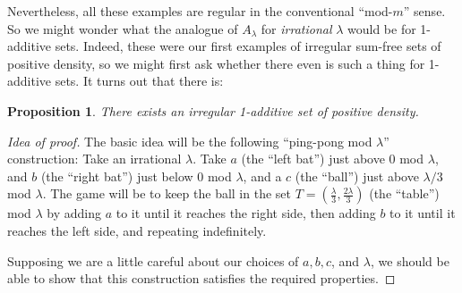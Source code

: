 \documentclass{report}
\newtheorem{proposition}[theorem]{Proposition}
\theoremstyle{remark}
\numberwithin{equation}{section}
\begin{document}
Nevertheless, all these examples are regular in the conventional
``mod-$m$'' sense.  So we might wonder what the analogue of
$A_\lambda$ for {\em irrational} $\lambda$ would be for 1-additive sets.
Indeed, these were our first examples of irregular sum-free sets of
positive density, so we might first ask whether there even is such a
thing for 1-additive sets.  It turns out that there is:

\begin{proposition}\label{prop:irr_1add}
  There exists an irregular 1-additive set of positive density.
\end{proposition}

\begin{proof}[Idea of proof]
  The basic idea will be the following ``ping-pong mod $\lambda$''
  construction: Take an irrational $\lambda$.  Take $a$ (the ``left
  bat'') just above $0$ mod $\lambda$, and $b$ (the ``right bat'')
  just below 0 mod $\lambda$, and a $c$ (the ``ball'') just above
  $\lambda/3$ mod $\lambda$.  The game will be to keep the ball in the
  set $T = (\frac{\lambda}{3}, \frac{2\lambda}{3})$ (the ``table'')
  mod $\lambda$ by adding $a$ to it until it reaches the right side,
  then adding $b$ to it until it reaches the left side, and repeating
  indefinitely.

  Supposing we are a little careful about our choices of $a, b, c$,
  and $\lambda$, we should be able to show that this construction
  satisfies the required properties.
\end{proof}
\end{document}
